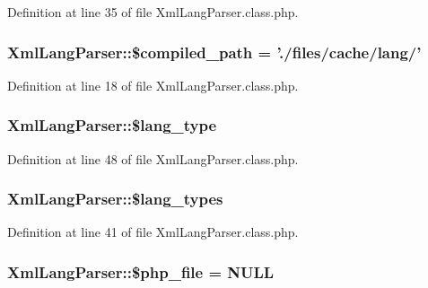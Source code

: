 Definition at line 35 of file Xml\-Lang\-Parser.\-class.\-php.

\hypertarget{classXmlLangParser_af56d412775229f27848e533873fe94f3}{
\subsubsection[{\$compiled\-\_\-path}]{\setlength{\rightskip}{0pt plus 5cm}Xml\-Lang\-Parser\-::\$compiled\-\_\-path = './files/cache/lang/'}}\label{classXmlLangParser_af56d412775229f27848e533873fe94f3}


Definition at line 18 of file Xml\-Lang\-Parser.\-class.\-php.

\hypertarget{classXmlLangParser_ac1289e1d349c8e40ef4afd26941cba5d}{
\subsubsection[{\$lang\-\_\-type}]{\setlength{\rightskip}{0pt plus 5cm}Xml\-Lang\-Parser\-::\$lang\-\_\-type}}\label{classXmlLangParser_ac1289e1d349c8e40ef4afd26941cba5d}


Definition at line 48 of file Xml\-Lang\-Parser.\-class.\-php.

\hypertarget{classXmlLangParser_a0385e815b92b65f3b3d12a29e54d1e36}{
\subsubsection[{\$lang\-\_\-types}]{\setlength{\rightskip}{0pt plus 5cm}Xml\-Lang\-Parser\-::\$lang\-\_\-types}}\label{classXmlLangParser_a0385e815b92b65f3b3d12a29e54d1e36}


Definition at line 41 of file Xml\-Lang\-Parser.\-class.\-php.

\hypertarget{classXmlLangParser_a0f8639ef765df04b8c4e7903de4353bb}{
\subsubsection[{\$php\-\_\-file}]{\setlength{\rightskip}{0pt plus 5cm}Xml\-Lang\-Parser\-::\$php\-\_\-file = N\-U\-L\-L}}\label{classXmlLangParser_a0f8639ef765df04b8c4e7903de4353bb}


